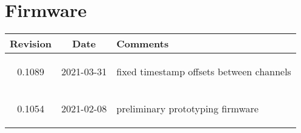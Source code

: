 \section{Firmware}
\begin{tabularx}{\textwidth}{|c|c|X|}
    \hline
    Revision & Date & Comments\\
    \hline\hline
	\hypertarget{fwrev}{0.1089} & 2021-03-31 & fixed timestamp offsets between channels\\
    \hypertarget{fwrev}{0.1054} & 2021-02-08 & preliminary prototyping firmware\\
    \hline
\end{tabularx}